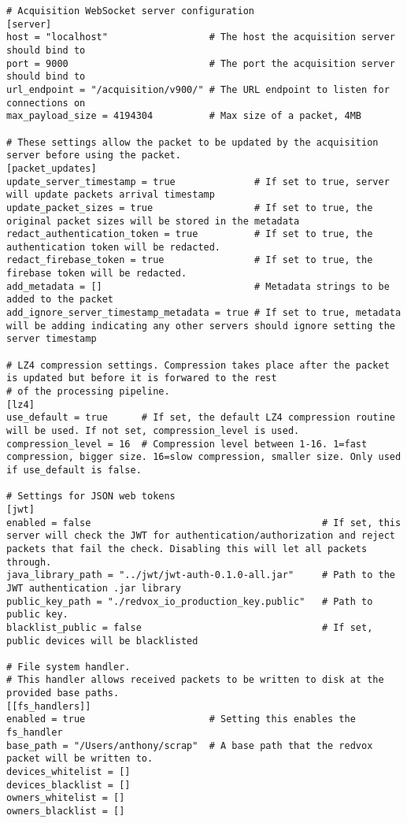 \begin{lstlisting}
# Acquisition WebSocket server configuration
[server]
host = "localhost"                  # The host the acquisition server should bind to
port = 9000                         # The port the acquisition server should bind to
url_endpoint = "/acquisition/v900/" # The URL endpoint to listen for connections on
max_payload_size = 4194304          # Max size of a packet, 4MB

# These settings allow the packet to be updated by the acquisition server before using the packet.
[packet_updates]
update_server_timestamp = true              # If set to true, server will update packets arrival timestamp
update_packet_sizes = true                  # If set to true, the original packet sizes will be stored in the metadata
redact_authentication_token = true          # If set to true, the authentication token will be redacted.
redact_firebase_token = true                # If set to true, the firebase token will be redacted.
add_metadata = []                           # Metadata strings to be added to the packet
add_ignore_server_timestamp_metadata = true # If set to true, metadata will be adding indicating any other servers should ignore setting the server timestamp

# LZ4 compression settings. Compression takes place after the packet is updated but before it is forwared to the rest
# of the processing pipeline.
[lz4]
use_default = true      # If set, the default LZ4 compression routine will be used. If not set, compression_level is used.
compression_level = 16  # Compression level between 1-16. 1=fast compression, bigger size. 16=slow compression, smaller size. Only used if use_default is false.

# Settings for JSON web tokens
[jwt]
enabled = false                                         # If set, this server will check the JWT for authentication/authorization and reject packets that fail the check. Disabling this will let all packets through.
java_library_path = "../jwt/jwt-auth-0.1.0-all.jar"     # Path to the JWT authentication .jar library
public_key_path = "./redvox_io_production_key.public"   # Path to public key.
blacklist_public = false                                # If set, public devices will be blacklisted

# File system handler.
# This handler allows received packets to be written to disk at the provided base paths.
[[fs_handlers]]
enabled = true                      # Setting this enables the fs_handler
base_path = "/Users/anthony/scrap"  # A base path that the redvox packet will be written to.
devices_whitelist = []
devices_blacklist = []
owners_whitelist = []
owners_blacklist = []


\end{lstlisting}
